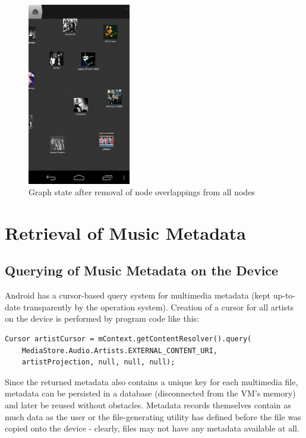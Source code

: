 \begin{figure}[H]
  \centering
    \includegraphics[width=0.4\textwidth]{figures/screen_mds_10_after_all_uncollided_nodes}
  \caption{Graph state after removal of node overlappings from all nodes}
  \label{fig:screen_mds_10_after_all_uncollided_nodes}
\end{figure}

\section{Retrieval of Music Metadata}

\subsection{Querying of Music Metadata on the Device}

Android has a cursor-based query system for multimedia metadata (kept up-to-date transparently by the
operation system). Creation of a cursor for all artists on the device is performed by program code like this:

\begin{verbatim}
Cursor artistCursor = mContext.getContentResolver().query(
	MediaStore.Audio.Artists.EXTERNAL_CONTENT_URI,
    artistProjection, null, null, null);
\end{verbatim}

Since the returned metadata also contains a unique key for each multimedia file, metadata can be
persisted in a database (disconnected from the VM's memory) and later be reused without obstacles.
Metadata records themselves contain as much data as the user or the file-generating utility has defined
before the file was copied onto the device - clearly, files may not have any metadata available at all.

